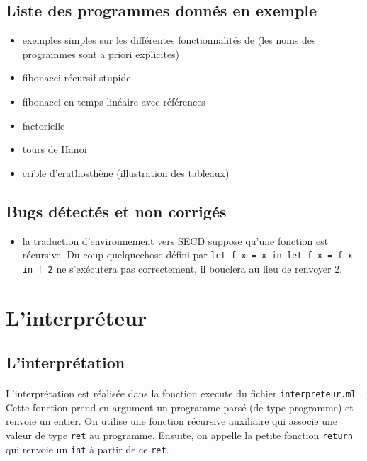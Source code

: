 \subsection{Liste des programmes \fouine donnés en exemple}

\begin{itemize}
 \item exemples simples sur les différentes fonctionnalités de \fouine (les noms des programmes sont a priori explicites)
 \item fibonacci récursif stupide
 \item fibonacci en temps linéaire avec références
 \item factorielle
 \item tours de Hanoi
 \item crible d'erathosthène (illustration des tableaux)
\end{itemize}

\subsection{Bugs détectés et non corrigés}

\begin{itemize}
 \item la traduction d'environnement \fouine vers SECD suppose qu'une fonction est récursive. Du coup quelquechose défini par
\texttt{let f x = x in let f x = f x in f 2} ne s'exécutera pas correctement, il bouclera au lieu de renvoyer 2.    
\end{itemize}



\section{L'interpréteur \fouine} %

\subsection{L'interprétation}

\paragraph{} L'interprétation est réalisée dans la fonction execute du fichier \texttt{interpreteur.ml} . Cette fonction prend en argument un programme \fouine parsé (de type programme) et renvoie un entier. On utilise une fonction récursive auxiliaire qui associe une valeur de type \texttt{ret} au programme. Ensuite, on appelle la petite fonction \texttt{return} qui renvoie un \texttt{int} à partir de ce \texttt{ret}.

